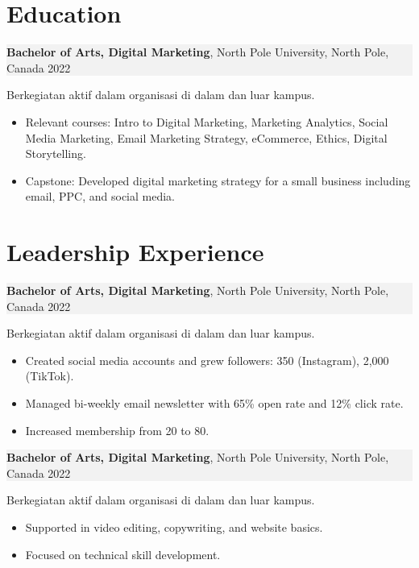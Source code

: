\documentclass[11pt,a4paper]{article}
\begin{document}
\vspace{0.3em}
\section*{Education}
\noindent
\setlength{\fboxsep}{0pt}%
\colorbox[HTML]{F2F2F2}{%
  \parbox{\linewidth}{%
    \textbf{Bachelor of Arts, Digital Marketing}, North Pole University, North Pole, Canada \hfill 2022%
  }%
}
\vspace{0.3em}
Berkegiatan aktif dalam organisasi di dalam dan luar kampus.
\begin{itemize}[left=1.5em, noitemsep, topsep=0pt]
    \item Relevant courses: Intro to Digital Marketing, Marketing Analytics, Social Media Marketing, Email Marketing Strategy, eCommerce, Ethics, Digital Storytelling.
    \item Capstone: Developed digital marketing strategy for a small business including email, PPC, and social media.
\end{itemize}

\vspace{0.3em}

\section*{Leadership Experience}
\noindent
\setlength{\fboxsep}{0pt}%
\colorbox[HTML]{F2F2F2}{%
  \parbox{\linewidth}{%
    \textbf{Bachelor of Arts, Digital Marketing}, North Pole University, North Pole, Canada \hfill 2022%
  }%
}
\vspace{0.3em}
Berkegiatan aktif dalam organisasi di dalam dan luar kampus.

\begin{itemize}[left=1.5em, noitemsep, topsep=0pt]
    \item Created social media accounts and grew followers: 350 (Instagram), 2,000 (TikTok).
    \item Managed bi-weekly email newsletter with 65\% open rate and 12\% click rate.
    \item Increased membership from 20 to 80.
\end{itemize}

\noindent
\setlength{\fboxsep}{0pt}%
\colorbox[HTML]{F2F2F2}{%
  \parbox{\linewidth}{%
    \textbf{Bachelor of Arts, Digital Marketing}, North Pole University, North Pole, Canada \hfill 2022%
  }%
}
\vspace{0.3em}
Berkegiatan aktif dalam organisasi di dalam dan luar kampus.
\begin{itemize}[left=1.5em, noitemsep, topsep=0pt]
    \item Supported in video editing, copywriting, and website basics.
    \item Focused on technical skill development.
\end{itemize}
\end{document}
